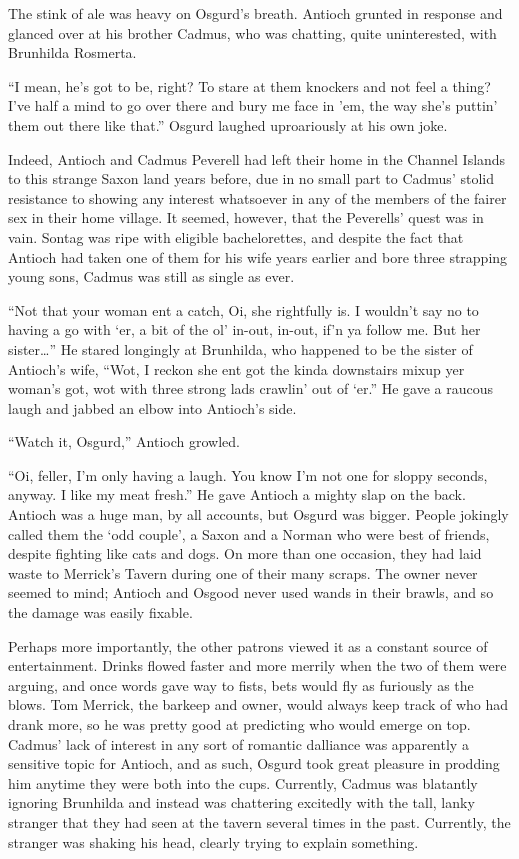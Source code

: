 The stink of ale was heavy on Osgurd’s breath. Antioch grunted in response and glanced over at his brother Cadmus, who was chatting, quite uninterested, with Brunhilda Rosmerta.

“I mean, he’s got to be, right? To stare at them knockers and not feel a thing? I’ve half a mind to go over there and bury me face in ’em, the way she’s puttin’ them out there like that.” Osgurd laughed uproariously at his own joke.

Indeed, Antioch and Cadmus Peverell had left their home in the Channel Islands to this strange Saxon land years before, due in no small part to Cadmus’ stolid resistance to showing any interest whatsoever in any of the members of the fairer sex in their home village. It seemed, however, that the Peverells’ quest was in vain. Sontag was ripe with eligible bachelorettes, and despite the fact that Antioch had taken one of them for his wife years earlier and bore three strapping young sons, Cadmus was still as single as ever.

“Not that your woman ent a catch, Oi, she rightfully is. I wouldn’t say no to having a go with ‘er, a bit of the ol’ in-out, in-out, if’n ya follow me. But her sister…” He stared longingly at Brunhilda, who happened to be the sister of Antioch’s wife, “Wot, I reckon she ent got the kinda downstairs mixup yer woman’s got, wot with three strong lads crawlin’ out of ‘er.” He gave a raucous laugh and jabbed an elbow into Antioch’s side.

“Watch it, Osgurd,” Antioch growled.

“Oi, feller, I’m only having a laugh. You know I’m not one for sloppy seconds, anyway. I like my meat fresh.” He gave Antioch a mighty slap on the back. Antioch was a huge man, by all accounts, but Osgurd was bigger. People jokingly called them the ‘odd couple’, a Saxon and a Norman who were best of friends, despite fighting like cats and dogs. On more than one occasion, they had laid waste to Merrick’s Tavern during one of their many scraps. The owner never seemed to mind; Antioch and Osgood never used wands in their brawls, and so the damage was easily fixable.

Perhaps more importantly, the other patrons viewed it as a constant source of entertainment. Drinks flowed faster and more merrily when the two of them were arguing, and once words gave way to fists, bets would fly as furiously as the blows. Tom Merrick, the barkeep and owner, would always keep track of who had drank more, so he was pretty good at predicting who would emerge on top.
Cadmus’ lack of interest in any sort of romantic dalliance was apparently a sensitive topic for Antioch, and as such, Osgurd took great pleasure in prodding him anytime they were both into the cups. Currently, Cadmus was blatantly ignoring Brunhilda and instead was chattering excitedly with the tall, lanky stranger that they had seen at the tavern several times in the past. Currently, the stranger was shaking his head, clearly trying to explain something.

